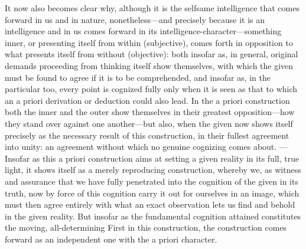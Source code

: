 \documentclass[12pt,a4paper]{book}
\begin{document}
It now also becomes clear why, although it is the selfsame intelligence that comes
forward in us and in nature, nonetheless---and precisely because it is an
intelligence and in us comes forward in its intelligence-character---something
inner, or presenting itself from within (subjective), comes forth in opposition to
what presents itself from without (objective): both insofar as, in general,
original demands proceeding from thinking itself show themselves, with which the
given must be found to agree if it is to be comprehended, and insofar as, in the
particular too, every point is cognized fully only when it is seen as that to which
an a priori derivation or deduction could also lead. In the a priori construction
both the inner and the outer show themselves in their greatest opposition---how
they stand over against one another---but also, when the given now shows itself
precisely as the necessary result of this construction, in their fullest agreement
into unity: an agreement without which no genuine cognizing comes about. ---Insofar
as this a priori construction aims at setting a given reality in its full, true
light, it shows itself as a merely reproducing construction, whereby we, as witness
and assurance that we have fully penetrated into the cognition of the given in its
truth, now by force of this cognition carry it out for ourselves in an image,
which must then agree entirely with what an exact observation lets us find and
behold in the given reality. But insofar as the fundamental cognition attained
constitutes the moving, all-determining First in this construction, the
construction comes forward as an independent one with the a priori character.
\end{document}
